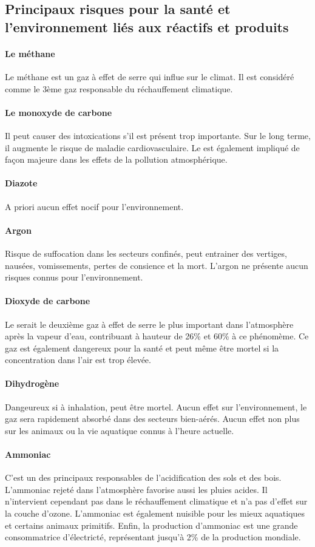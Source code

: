 \subsection{Principaux risques pour la santé et l'environnement liés aux réactifs et produits}
\paragraph{Le méthane} Le méthane est un gaz à effet de serre qui influe
sur le climat. Il est considéré comme le 3ème gaz responsable du
réchauffement climatique.
\paragraph{Le monoxyde de carbone} Il peut causer des intoxications s'il est
présent trop importante. Sur le long terme, il augmente le risque de maladie
cardiovasculaire. Le  est également impliqué de façon majeure
dans les effets de la pollution atmosphérique.
\paragraph{Diazote} A priori aucun effet nocif pour l'environnement.
\paragraph{Argon} Risque de suffocation dans les secteurs confinés, peut
entrainer des vertiges, nausées, vomissements, pertes de consience et la mort.
L'argon ne présente aucun risques connus pour l'environnement.
\paragraph{Dioxyde de carbone} Le  serait le deuxième
gaz à effet de serre le plus important dans l'atmosphère après la vapeur
d'eau, contribuant à hauteur de 26\% et 60\% à ce phénomème. Ce gaz
est également dangereux pour la santé et peut même être mortel si
la concentration dans l'air est trop élevée.
\paragraph{Dihydrogène} Dangeureux si à inhalation, peut être mortel.
Aucun effet sur l'environnement, le gaz
sera rapidement absorbé dans des secteurs bien-aérés. Aucun
effet non plus sur les animaux ou la vie aquatique connus à l'heure
actuelle.
\paragraph{Ammoniac} C'est un des principaux responsables
de l'acidification des sols et des bois. L'ammoniac rejeté
dans l'atmosphère favorise aussi les pluies acides. Il 
n'intervient cependant pas dans le réchauffement climatique et n'a pas
d'effet sur la couche d'ozone. L'ammoniac
est également nuisible pour les mieux aquatiques et certains
animaux primitifs. Enfin, la production d'ammoniac est une grande
consommatrice d'électricté, représentant jusqu'à 2\% de la
production mondiale.

